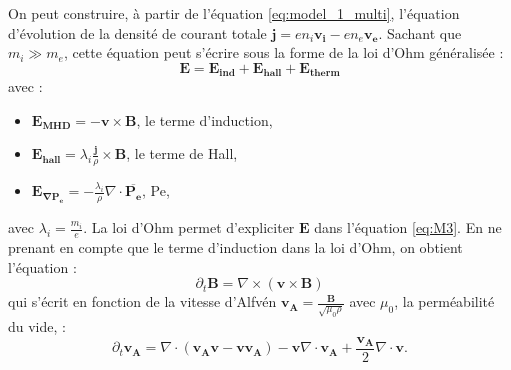 On peut construire, à partir de l'équation \eqref{eq:model_1_multi}, l'équation d'évolution de la densité de courant totale $\boldsymbol{j} = e n_i \boldsymbol{v_i} - e n_e \boldsymbol{v_e}$. Sachant que $m_i \gg m_e$, cette équation peut s'écrire sous la forme de la loi d'Ohm généralisée : \begin{equation} 
\boldsymbol{E} =  \boldsymbol{E_{ind}} +  \boldsymbol{E_{hall}} +  \boldsymbol{E_{therm}} \label{eq:ohm} 
\end{equation}
avec :
\begin{itemize}
 \item $\boldsymbol{E_{MHD}} =  - \boldsymbol{v} \times \boldsymbol{B}$, le terme d'induction,
 \item $\boldsymbol{E_{hall}} = \lambda_i \frac{\boldsymbol{j}}{\rho} \times \boldsymbol{B}$, le terme de \acl{Hall},
 \item $\boldsymbol{E_{\nabla P_e}} = - \frac{\lambda_i}{\rho} \nabla \cdot \overline{\boldsymbol{P_{e}}}$,  \acl{Pe},
\end{itemize}
avec $\lambda_i = \frac{m_i}{e}$. La loi d'Ohm permet d'expliciter $\boldsymbol{E}$ dans l'équation \eqref{eq:M3}. En ne prenant en compte que le terme d'induction dans la loi d'Ohm, on obtient l'équation : 
\begin{equation}
    \label{eq:model_M3_ideal} \partial_t \boldsymbol{B} = \nabla \times \left(\boldsymbol{v} \times \boldsymbol{B} \right)
\end{equation}
qui s'écrit en fonction de la vitesse d'Alfvén $\boldsymbol{v_A} = \frac{\boldsymbol{B}}{\sqrt{\mu_0 \rho}}$ avec $\mu_0$, la perméabilité du vide, : 
\begin{equation}
\label{eq:model_M3_idealvA} \partial_t \boldsymbol{v_A}  =   \nabla \cdot \left(\boldsymbol{v_A}\boldsymbol{v} - \boldsymbol{v}\boldsymbol{v_A}\right) -  \boldsymbol{v}  \nabla \cdot \boldsymbol{v_A} +  \frac{\boldsymbol{v_A}}{2}  \nabla \cdot \boldsymbol{v}. \end{equation}

